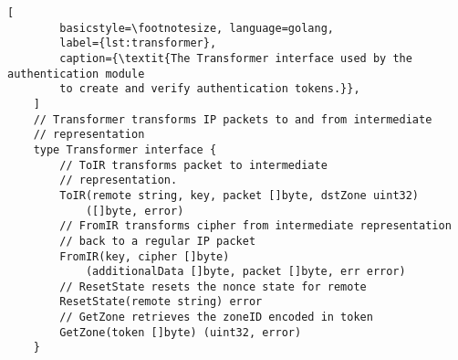 \begin{minipage}{\linewidth} %
	\begin{lstlisting}[
		basicstyle=\footnotesize, language=golang,
		label={lst:transformer},
		caption={\textit{The Transformer interface used by the authentication module 
		to create and verify authentication tokens.}},
	]
	// Transformer transforms IP packets to and from intermediate
	// representation
	type Transformer interface {
		// ToIR transforms packet to intermediate
		// representation.
		ToIR(remote string, key, packet []byte, dstZone uint32)
			([]byte, error)
		// FromIR transforms cipher from intermediate representation
		// back to a regular IP packet
		FromIR(key, cipher []byte)
			(additionalData []byte, packet []byte, err error)
		// ResetState resets the nonce state for remote	
		ResetState(remote string) error
		// GetZone retrieves the zoneID encoded in token
		GetZone(token []byte) (uint32, error)
	}
	\end{lstlisting}
\end{minipage}
